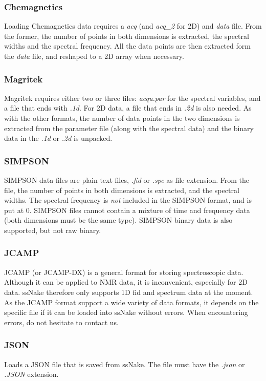 \documentclass[11pt,a4paper]{article}
\begin{document}
\subsubsection*{Chemagnetics}
Loading Chemagnetics data requires a \textit{acq} (and \textit{acq\_2} for 2D) and \textit{data} file. From the former, the number of points in both dimensions is extracted, the spectral widths and the spectral frequency. All the data points are then extracted form the \textit{data} file, and reshaped to a 2D array when necessary.

\subsubsection*{Magritek}
Magritek requires either two or three files: \textit{acqu.par} for the spectral variables, and a file that ends with \textit{.1d}. For 2D data, a file that ends in \textit{.2d} is also needed. As with the other formats, the number of data points in the two dimensions is extracted from the parameter file (along with the spectral data) and the binary data in the \textit{.1d} or \textit{.2d} is unpacked.

\subsubsection*{SIMPSON}
SIMPSON data files are plain text files, \textit{.fid} or \textit{.spe} as file extension. From the file, the number of points in both dimensions is extracted, and the spectral widths. The spectral frequency is \textit{not} included in the SIMPSON format, and is put at 0. SIMPSON files cannot contain a mixture of time and frequency data (both dimensions must be the same type). SIMPSON binary data is also supported, but not raw binary.

\subsubsection*{JCAMP}
JCAMP (or JCAMP-DX) is a general format for storing spectroscopic data. Although it can be applied to NMR data, it is inconvenient, especially for 2D data. ssNake therefore only supports 1D fid and spectrum data at the moment. As the JCAMP format support a wide variety of data formats, it depends on the specific file if it can be loaded into ssNake without errors. When encountering errors, do not hesitate to contact us.

\subsubsection*{JSON}
Loads a JSON file that is saved from ssNake. The file must have the \textit{.json} or \textit{.JSON} extension.
\end{document}
